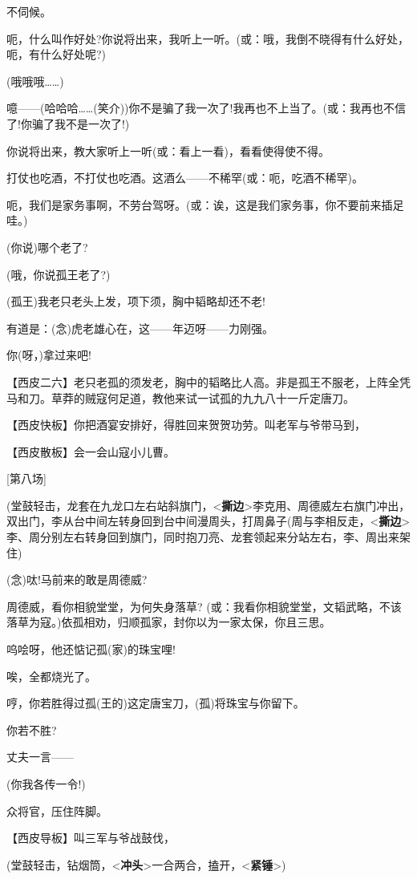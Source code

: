 不伺候。

呃，什么叫作好处?你说将出来，我听上一听。(或：哦，我倒不晓得有什么好处，呃，有什么好处呢?)

(哦哦哦\ldots{}\ldots{})

噫------(哈哈哈\ldots{}\ldots{}(笑介))你不是骗了我一次了!我再也不上当了。(或：我再也不信了!你骗了我不是一次了!)

你说将出来，教大家听上一听(或：看上一看)，看看使得使不得。

打仗也吃酒，不打仗也吃酒。这酒么------不稀罕(或：呃，吃酒不稀罕)。

呃，我们是家务事啊，不劳台驾呀。(或：诶，这是我们家务事，你不要前来插足哇。)

(你说)哪个老了?

(哦，你说孤王老了?)

(孤王)我老只老头上发，项下须，胸中韬略却还不老!

有道是：(念)虎老雄心在，这------年迈呀------力刚强。

你(呀，)拿过来吧!

【西皮二六】老只老孤的须发老，胸中的韬略比人高。非是孤王不服老，上阵全凭马和刀。草莽的贼寇何足道，教他来试一试孤的九九八十一斤定唐刀。

【西皮快板】你把酒宴安排好，得胜回来贺贺功劳。叫老军与爷带马到，

【西皮散板】会一会山寇小儿曹。

{[}第八场{]}

(堂鼓轻击，龙套在九龙口左右站斜旗门，\textless{}\textbf{撕边}\textgreater{}李克用、周德威左右旗门冲出，双出门，李从台中间左转身回到台中间漫周头，打周鼻子(周与李相反走，\textless{}\textbf{撕边}\textgreater{}李、周分别左右转身回到旗门，同时抱刀亮、龙套领起来分站左右，李、周出来架住)

(念)呔!马前来的敢是周德威?

周德威，看你相貌堂堂，为何失身落草?
(或：我看你相貌堂堂，文韬武略，不该落草为寇。)依孤相劝，归顺孤家，封你以为一家太保，你且三思。

呜哙呀，他还惦记孤(家)的珠宝哩!

唉，全都烧光了。

哼，你若胜得过孤(王的)这定唐宝刀，(孤)将珠宝与你留下。

你若不胜?

丈夫一言------

(你我各传一令!)

众将官，压住阵脚。

【西皮导板】叫三军与爷战鼓伐，

(堂鼓轻击，钻烟筒，\textless{}\textbf{冲头}\textgreater{}一合两合，搕开，\textless{}\textbf{紧锤}\textgreater{})

